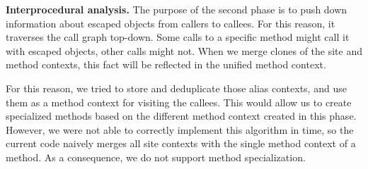 \documentclass[letterpaper]{article}
\newcommand{\mypar}[1]{{\bf #1.}}
\begin{document}
\mypar{Interprocedural analysis}
The purpose of the second phase is to push down information about escaped objects from callers to callees.
For this reason, it traverses the call graph top-down. Some calls to a specific method might call it
with escaped objects, other calls might not. When we merge clones of the site and method contexts,
this fact will be reflected in the unified method context. 

For this reason, we tried to store and deduplicate those alias contexts, and use them as a method context
for visiting the callees. This would allow us to create specialized methods based on the different
method context created in this phase. However, we were not able to correctly implement this algorithm in time,
so the current code naively merges all site contexts with the single method context of a method.
As a consequence, we do not support method specialization.

\end{document}
